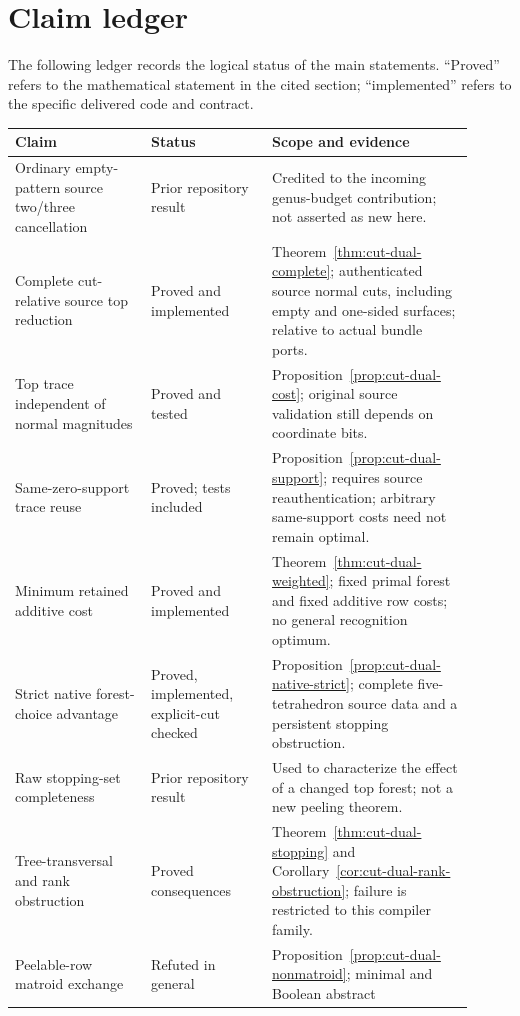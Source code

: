 \section{Claim ledger}
\label{app:claims}

The following ledger records the logical status of the main statements.
``Proved'' refers to the mathematical statement in the cited section;
``implemented'' refers to the specific delivered code and contract.

\begin{longtable}{P{0.27\linewidth}P{0.24\linewidth}P{0.40\linewidth}}
\toprule
Claim & Status & Scope and evidence\\
\midrule
\endhead
Ordinary empty-pattern source two/three cancellation & Prior repository
result & Credited to the incoming genus-budget contribution; not asserted
as new here.\\
Complete cut-relative source top reduction & Proved and implemented &
Theorem~\ref{thm:cut-dual-complete}; authenticated source normal cuts,
including empty and one-sided surfaces; relative to actual bundle ports.\\
Top trace independent of normal magnitudes & Proved and tested &
Proposition~\ref{prop:cut-dual-cost}; original source validation still
depends on coordinate bits.\\
Same-zero-support trace reuse & Proved; tests included &
Proposition~\ref{prop:cut-dual-support}; requires source reauthentication;
arbitrary same-support costs need not remain optimal.\\
Minimum retained additive cost & Proved and implemented &
Theorem~\ref{thm:cut-dual-weighted}; fixed primal forest and fixed additive
row costs; no general recognition optimum.\\
Strict native forest-choice advantage & Proved, implemented, explicit-cut
checked & Proposition~\ref{prop:cut-dual-native-strict}; complete
five-tetrahedron source data and a persistent stopping obstruction.\\
Raw stopping-set completeness & Prior repository result & Used to
characterize the effect of a changed top forest; not a new peeling theorem.\\
Tree-transversal and rank obstruction & Proved consequences &
Theorem~\ref{thm:cut-dual-stopping} and
Corollary~\ref{cor:cut-dual-rank-obstruction}; failure is restricted to
this compiler family.\\
Peelable-row matroid exchange & Refuted in general &
Proposition~\ref{prop:cut-dual-nonmatroid}; minimal and Boolean abstract

\end{longtable}
